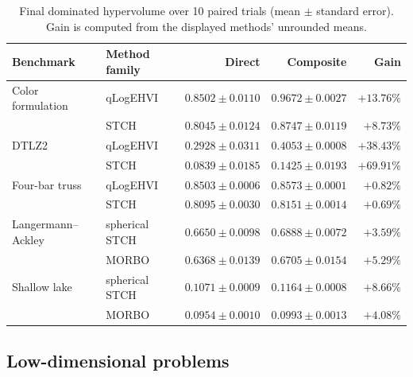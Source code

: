\documentclass{article}
\begin{document}
\begin{table}[t]
\centering
\caption{Final dominated hypervolume over 10 paired trials (mean $\pm$ standard
error).  Gain is computed from the displayed methods' unrounded means.}
\label{tab:results}
\footnotesize
\setlength{\tabcolsep}{3.8pt}
\begin{tabular}{llrrr}
\toprule
Benchmark & Method family & Direct & Composite & Gain \\
\midrule
Color formulation & qLogEHVI
  & $0.8502\!\pm\!0.0110$ & $0.9672\!\pm\!0.0027$ & $+13.76\%$ \\
 & STCH
  & $0.8045\!\pm\!0.0124$ & $0.8747\!\pm\!0.0119$ & $+8.73\%$ \\
DTLZ2 & qLogEHVI
  & $0.2928\!\pm\!0.0311$ & $0.4053\!\pm\!0.0008$ & $+38.43\%$ \\
 & STCH
  & $0.0839\!\pm\!0.0185$ & $0.1425\!\pm\!0.0193$ & $+69.91\%$ \\
Four-bar truss & qLogEHVI
  & $0.8503\!\pm\!0.0006$ & $0.8573\!\pm\!0.0001$ & $+0.82\%$ \\
 & STCH
  & $0.8095\!\pm\!0.0030$ & $0.8151\!\pm\!0.0014$ & $+0.69\%$ \\
\midrule
Langermann--Ackley & spherical STCH
  & $0.6650\!\pm\!0.0098$ & $0.6888\!\pm\!0.0072$ & $+3.59\%$ \\
 & MORBO
  & $0.6368\!\pm\!0.0139$ & $0.6705\!\pm\!0.0154$ & $+5.29\%$ \\
Shallow lake & spherical STCH
  & $0.1071\!\pm\!0.0009$ & $0.1164\!\pm\!0.0008$ & $+8.66\%$ \\
 & MORBO
  & $0.0954\!\pm\!0.0010$ & $0.0993\!\pm\!0.0013$ & $+4.08\%$ \\
\bottomrule
\end{tabular}
\end{table}

\subsection{Low-dimensional problems}
\end{document}

